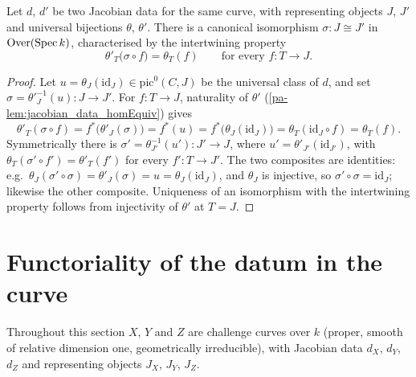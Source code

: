\begin{definition}
  \label{pa-def:jacobian_data_unique}
  \leanok

  Let \(d\), \(d'\) be two Jacobian data for the same curve, with representing
  objects \(J\), \(J'\) and universal bijections \(\theta\), \(\theta'\). There
  is a canonical isomorphism \(\sigma : J \cong J'\) in \(\mathrm{Over}(\operatorname{Spec} k)\),
  characterised by the intertwining property
  \[
    \theta'_T\bigl(\sigma \circ f\bigr) = \theta_T(f)
    \qquad \text{for every } f : T \to J .
  \]
\end{definition}
\begin{proof}
  \leanok
  Let \(u = \theta_J(\mathrm{id}_J) \in \mathrm{pic}^0(C, J)\) be the universal
  class of \(d\), and set \(\sigma = \theta'^{-1}_J(u) : J \to J'\).
  For \(f : T \to J\), naturality of \(\theta'\)
  (\ref{pa-lem:jacobian_data_homEquiv}) gives
  \[
    \theta'_T(\sigma \circ f) = f^*\bigl(\theta'_J(\sigma)\bigr)
    = f^*(u) = f^*\bigl(\theta_J(\mathrm{id}_J)\bigr)
    = \theta_T(\mathrm{id}_J \circ f) = \theta_T(f).
  \]
  Symmetrically there is \(\sigma' = \theta^{-1}_{J'}(u') : J' \to J\), where
  \(u' = \theta'_{J'}(\mathrm{id}_{J'})\), with
  \(\theta_T(\sigma' \circ f') = \theta'_T(f')\) for every \(f' : T \to J'\).
  The two composites are identities: e.g.\
  \(\theta_J(\sigma' \circ \sigma) = \theta'_J(\sigma) = u =
  \theta_J(\mathrm{id}_J)\), and \(\theta_J\) is injective, so
  \(\sigma' \circ \sigma = \mathrm{id}_J\); likewise the other composite.
  Uniqueness of an isomorphism with the intertwining property follows from
  injectivity of \(\theta'\) at \(T = J\).
\end{proof}

\section{Functoriality of the datum in the curve}
\label{pa-sec:jacobian_datum_functoriality}

Throughout this section \(X\), \(Y\) and \(Z\) are challenge curves over \(k\)
(proper, smooth of relative dimension one, geometrically irreducible), with
Jacobian data \(d_X\), \(d_Y\), \(d_Z\) and representing objects \(J_X\),
\(J_Y\), \(J_Z\).

